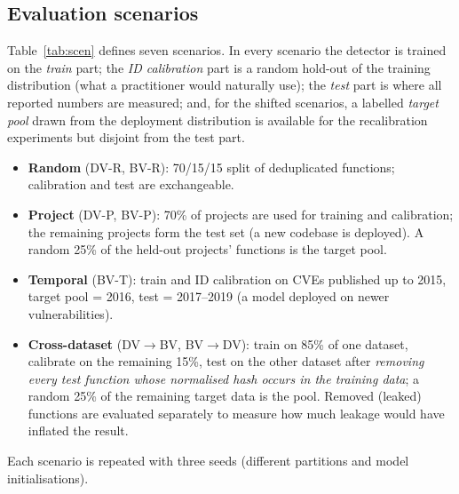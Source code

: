 \subsection{Evaluation scenarios}
Table~\ref{tab:scen} defines seven scenarios. In every scenario the detector is trained on the \emph{train} part; the \emph{ID calibration} part is a random hold-out of the training distribution (what a practitioner would naturally use); the \emph{test} part is where all reported numbers are measured; and, for the shifted scenarios, a labelled \emph{target pool} drawn from the deployment distribution is available for the recalibration experiments but disjoint from the test part.
\begin{itemize}[itemsep=1pt]
\item \textbf{Random} (DV-R, BV-R): 70/15/15 split of deduplicated functions; calibration and test are exchangeable.
\item \textbf{Project} (DV-P, BV-P): 70\% of projects are used for training and calibration; the remaining projects form the test set (a new codebase is deployed). A random 25\% of the held-out projects' functions is the target pool.
\item \textbf{Temporal} (BV-T): train and ID calibration on CVEs published up to 2015, target pool = 2016, test = 2017--2019 (a model deployed on newer vulnerabilities).
\item \textbf{Cross-dataset} (DV$\to$BV, BV$\to$DV): train on 85\% of one dataset, calibrate on the remaining 15\%, test on the other dataset after \emph{removing every test function whose normalised hash occurs in the training data}; a random 25\% of the remaining target data is the pool. Removed (leaked) functions are evaluated separately to measure how much leakage would have inflated the result.
\end{itemize}
Each scenario is repeated with three seeds (different partitions and model initialisations).



